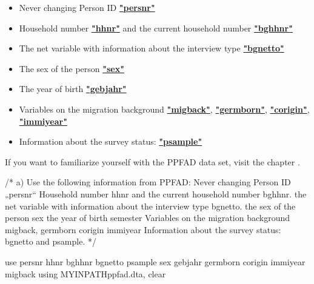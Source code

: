 \documentclass[letterpaper,10pt,openany,onesideH,english]{sphinxmanual}
\begin{document}
\begin{itemize}
\item {} 
Never changing Person ID  \href{https://paneldata.org/soep-core/data/ppfad/persnr}{\textbf{"persnr"}}

\item {} 
Household number  \href{https://paneldata.org/soep-core/data/ppfad/hhnr}{\textbf{"hhnr"}} and the current household number  \href{https://paneldata.org/soep-core/data/ppfad/bghhnr}{\textbf{"bghhnr"}}

\item {} 
The net variable with information about the interview type  \href{https://paneldata.org/soep-core/data/ppfad/bgnetto}{\textbf{"bgnetto"}}

\item {} 
The sex of the person  \href{https://paneldata.org/soep-core/data/ppfad/sex}{\textbf{"sex"}}

\item {} 
The year of birth  \href{https://paneldata.org/soep-core/data/ppfad/gebjahr}{\textbf{"gebjahr"}}

\item {} 
Variables on the migration background  \href{https://paneldata.org/soep-core/data/ppfad/migback}{\textbf{"migback"}},  \href{https://paneldata.org/soep-core/data/ppfad/germborn}{\textbf{"germborn"}},  \href{https://paneldata.org/soep-core/data/ppfad/corigin}{\textbf{"corigin"}},  \href{https://paneldata.org/soep-core/data/ppfad/immiyear}{\textbf{"immiyear"}}

\item {} 
Information about the survey status:  \href{https://paneldata.org/soep-core/data/ppfad/psample}{\textbf{"psample"}}

\end{itemize}

If you want to familiarize yourself with the PPFAD data set, visit the chapter {\hyperref[\detokenize{Working with SOEP Data/index:working-ppfad}]{}}.

%
\begin{sphinxVerbatim}[commandchars=\\\{\},numbers=left,firstnumber=1,stepnumber=1]
/*
a)	Use the following information from PPFAD: 
  \PYGZhy{} Never changing Person ID „persnr“
  \PYGZhy{} Household number \PYGZdq{}hhnr\PYGZdq{} and the current household number \PYGZdq{}bghhnr\PYGZdq{}. 
  \PYGZhy{} the net variable with information about the interview type \PYGZdq{}bgnetto\PYGZdq{}.
  \PYGZhy{} the sex of the person \PYGZdq{}sex\PYGZdq{}
  \PYGZhy{} the year of birth \PYGZdq{}semester\PYGZdq{}
  \PYGZhy{} Variables on the migration background \PYGZdq{}migback\PYGZdq{}, \PYGZdq{}germborn\PYGZdq{} \PYGZdq{}corigin\PYGZdq{} \PYGZdq{}immiyear\PYGZdq{}
  \PYGZhy{} Information about the survey status: \PYGZdq{}bgnetto\PYGZdq{} and \PYGZdq{}psample\PYGZdq{}.
*/

use persnr hhnr bghhnr bgnetto psample sex gebjahr germborn corigin immiyear migback  using \PYGZdl{}MY\PYGZus{}IN\PYGZus{}PATH\PYGZbs{}ppfad.dta, clear
\end{sphinxVerbatim}
\end{document}
